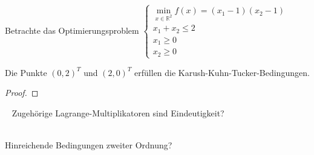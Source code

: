 
Betrachte das Optimierungsproblem $\begin{cases}\min\limits_{x\in\mathbb R^2} f(x)=(x_1-1)(x_2-1)\\x_1+x_2\leq 2\\x_1\geq 0\\x_2\geq 0\end{cases}$\newline\newline
\begin{compactenum}[(i)]
\item Die Punkte $(0,2)^T$ und $(2,0)^T$ erfüllen die Karush-Kuhn-Tucker-Bedingungen.
\begin{proof}
\end{proof}~\newline
Zugehörige Lagrange-Multiplikatoren sind
Eindeutigkeit?\\\\
\item Hinreichende Bedingungen zweiter Ordnung?
\end{compactenum}